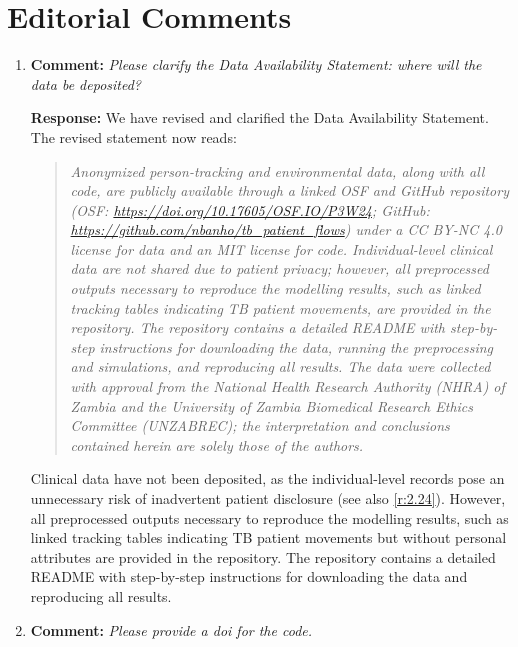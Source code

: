 \documentclass[11pt]{article}
\newcommand{\comment}[1]{\textbf{Comment:} \textit{#1}}
\newcommand{\response}[1]{\textbf{Response:} #1}
\begin{document}
\clearpage

\section*{Editorial Comments}

\begin{enumerate}[label=\textbf{E\arabic*.}, leftmargin=*]

\item\label{r:E1} \comment{Please clarify the Data Availability Statement: where will the data be deposited?}

\response{We have revised and clarified the Data Availability Statement. The revised statement now reads:

\begin{quote}
\textit{Anonymized person-tracking and environmental data, along with all code, are publicly available through a linked OSF and GitHub repository (OSF: \url{https://doi.org/10.17605/OSF.IO/P3W24}; GitHub: \url{https://github.com/nbanho/tb_patient_flows}) under a CC BY-NC 4.0 license for data and an MIT license for code. Individual-level clinical data are not shared due to patient privacy; however, all preprocessed outputs necessary to reproduce the modelling results, such as linked tracking tables indicating TB patient movements, are provided in the repository. The repository contains a detailed README with step-by-step instructions for downloading the data, running the preprocessing and simulations, and reproducing all results. The data were collected with approval from the National Health Research Authority (NHRA) of Zambia and the University of Zambia Biomedical Research Ethics Committee (UNZABREC); the interpretation and conclusions contained herein are solely those of the authors.}
\end{quote}

Clinical data have not been deposited, as the individual-level records pose an unnecessary risk of inadvertent patient disclosure (see also \ref{r:2.24}). However, all preprocessed outputs necessary to reproduce the modelling results, such as linked tracking tables indicating TB patient movements but without personal attributes are provided in the repository. The repository contains a detailed README with step-by-step instructions for downloading the data and reproducing all results.}

\item\label{r:E2} \comment{Please provide a doi for the code.}


\end{enumerate}
\end{document}
